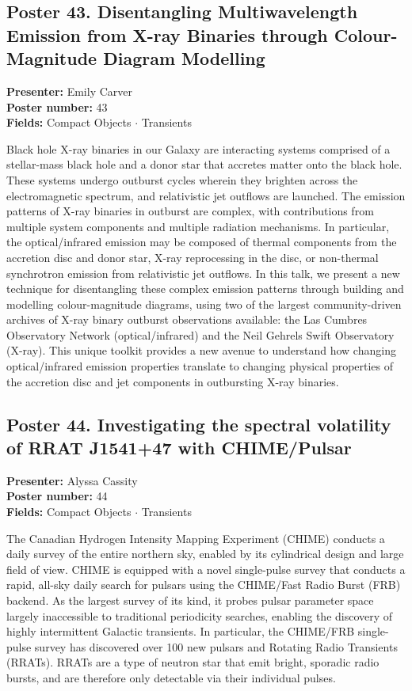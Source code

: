 \subsection*{Poster 43. Disentangling Multiwavelength Emission from X-ray Binaries through Colour-Magnitude Diagram Modelling}
\textbf{Presenter:} Emily Carver\\
\textbf{Poster number:} 43\\
\textbf{Fields:} Compact Objects $\cdot$ Transients

Black hole X-ray binaries in our Galaxy are interacting systems comprised of a stellar-mass black hole and a donor star that accretes matter onto the black hole. These systems undergo outburst cycles wherein they brighten across the electromagnetic spectrum, and relativistic jet outflows are launched. The emission patterns of X-ray binaries in outburst are complex, with contributions from multiple system components and multiple radiation mechanisms. In particular, the optical/infrared emission may be composed of thermal components from the accretion disc and donor star, X-ray reprocessing in the disc, or non-thermal synchrotron emission from relativistic jet outflows. In this talk, we present a new technique for disentangling these complex emission patterns through building and modelling colour-magnitude diagrams, using two of the largest community-driven archives of X-ray binary outburst observations available: the Las Cumbres Observatory Network (optical/infrared) and the Neil Gehrels Swift Observatory (X-ray). This unique toolkit provides a new avenue to understand how changing optical/infrared emission properties translate to changing physical properties of the accretion disc and jet components in outbursting X-ray binaries.

\hypertarget{poster-abstract-talk-277}{}\label{poster-abstract-page-talk-277}
\subsection*{Poster 44. Investigating the spectral volatility of RRAT J1541+47 with CHIME/Pulsar}
\textbf{Presenter:} Alyssa Cassity\\
\textbf{Poster number:} 44\\
\textbf{Fields:} Compact Objects $\cdot$ Transients

The Canadian Hydrogen Intensity Mapping Experiment (CHIME) conducts a daily survey of the entire northern sky, enabled by its cylindrical design and large field of view. CHIME is equipped with a novel single-pulse survey that conducts a rapid, all-sky daily search for pulsars using the CHIME/Fast Radio Burst (FRB) backend. As the largest survey of its kind, it probes pulsar parameter space largely inaccessible to traditional periodicity searches, enabling the discovery of highly intermittent Galactic transients. In particular, the CHIME/FRB single-pulse survey has discovered over 100 new pulsars and Rotating Radio Transients (RRATs). RRATs are a type of neutron star that emit bright, sporadic radio bursts, and are therefore only detectable via their individual pulses.

